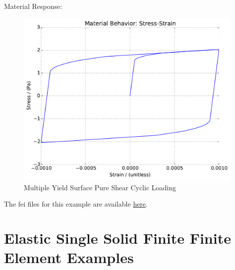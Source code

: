 \documentclass[fleqn,11pt]{article}
\begin{document}
Material Response:
\begin{figure}[H]
\begin{center}
\includegraphics[width=11cm]{../fei_examples/Multi_Yield_Surface_von_Mises/2pure_shear_cyclic_loading/result.pdf}
\caption{
\label{Multiple Yield Surface Pure Shear Cycli}
Multiple Yield Surface Pure Shear Cyclic Loading}
\end{center}
\end{figure}

The fei files for this example are available \href{https://github.com/yuan-energy/education_examples/tree/master/fei_examples/Multi_Yield_Surface_von_Mises/2pure_shear_cyclic_loading}{here}.

















\newpage
\section{Elastic Single Solid Finite Finite Element Examples}
\label{section_elastic_brick_example}
\end{document}
